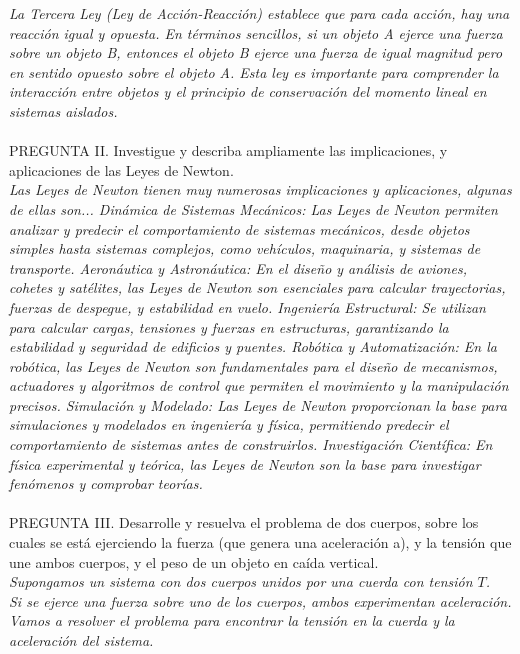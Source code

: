 \documentclass{article}
\begin{document}
\textit{La Tercera Ley (Ley de Acción-Reacción) establece que para cada acción, hay una reacción igual y opuesta. En términos sencillos, si un objeto A ejerce una fuerza sobre un objeto B, entonces el objeto B ejerce una fuerza de igual magnitud pero en sentido opuesto sobre el objeto A. Esta ley es importante para comprender la interacción entre objetos y el principio de conservación del momento lineal en sistemas aislados.}\\\\


PREGUNTA II. Investigue y describa ampliamente las implicaciones, y aplicaciones de las Leyes de Newton.\\
\textit{Las Leyes de Newton tienen muy numerosas implicaciones y aplicaciones, algunas de ellas son... Dinámica de Sistemas Mecánicos: Las Leyes de Newton permiten analizar y predecir el comportamiento de sistemas mecánicos, desde objetos simples hasta sistemas complejos, como vehículos, maquinaria, y sistemas de transporte. Aeronáutica y Astronáutica: En el diseño y análisis de aviones, cohetes y satélites, las Leyes de Newton son esenciales para calcular trayectorias, fuerzas de despegue, y estabilidad en vuelo. Ingeniería Estructural: Se utilizan para calcular cargas, tensiones y fuerzas en estructuras, garantizando la estabilidad y seguridad de edificios y puentes. Robótica y Automatización: En la robótica, las Leyes de Newton son fundamentales para el diseño de mecanismos, actuadores y algoritmos de control que permiten el movimiento y la manipulación precisos. Simulación y Modelado: Las Leyes de Newton proporcionan la base para simulaciones y modelados en ingeniería y física, permitiendo predecir el comportamiento de sistemas antes de construirlos. Investigación Científica: En física experimental y teórica, las Leyes de Newton son la base para investigar fenómenos y comprobar teorías.}\\\\

PREGUNTA III. Desarrolle y resuelva el problema de dos cuerpos, sobre los cuales se está ejerciendo la fuerza (que genera una 
 aceleración a), y la tensión que une ambos cuerpos, y el peso de un objeto en caída vertical.\\
 \textit{Supongamos un sistema con dos cuerpos unidos por una cuerda con tensión \(T\).} \\ 
\textit{Si se ejerce una fuerza sobre uno de los cuerpos, ambos experimentan aceleración. Vamos a resolver el problema para encontrar la tensión en la cuerda y la aceleración del sistema.} \\
\end{document}
